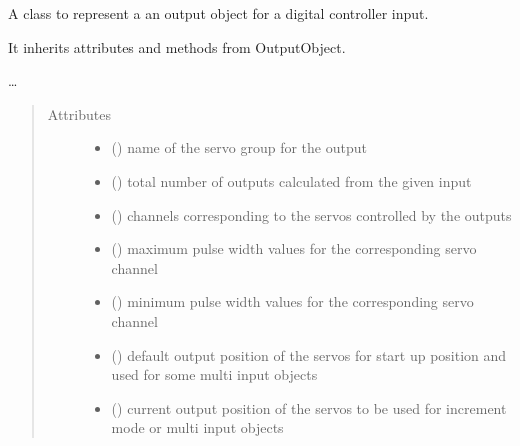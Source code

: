 \documentclass[letterpaper,10pt,english]{sphinxmanual}
\begin{document}
\begin{fulllineitems}
\label{\detokenize{generic:DigitalOutputObject.DigitalOutputObject}}
\sphinxAtStartPar
A class to represent a an output object for a digital controller input.

\sphinxAtStartPar
It inherits attributes and methods from OutputObject.

\sphinxAtStartPar
…
\begin{quote}\begin{description}
\item[{Attributes}] \leavevmode\begin{itemize}
\item {} 
\sphinxAtStartPar
{}() \textendash{} name of the servo group for the output

\item {} 
\sphinxAtStartPar
{}() \textendash{} total number of outputs 
calculated from the given input

\item {} 
\sphinxAtStartPar
{}(\sphinxstyleemphasis{{[}int{]}}) \textendash{} channels corresponding to 
the servos controlled by the outputs

\item {} 
\sphinxAtStartPar
{}(\sphinxstyleemphasis{{[}int{]}}) \textendash{} maximum pulse width values 
for the corresponding servo channel

\item {} 
\sphinxAtStartPar
{}(\sphinxstyleemphasis{{[}int{]}}) \textendash{} minimum pulse width values 
for the corresponding servo channel

\item {} 
\sphinxAtStartPar
{}(\sphinxstyleemphasis{{[}int{]}}) \textendash{} default output position of 
the servos for start up position and used for some multi input 
objects

\item {} 
\sphinxAtStartPar
{}(\sphinxstyleemphasis{{[}int{]}}) \textendash{} current output position of the 
servos to be used for increment mode or multi input objects


\end{itemize}
\end{description}
\end{quote}
\end{fulllineitems}
\end{document}
